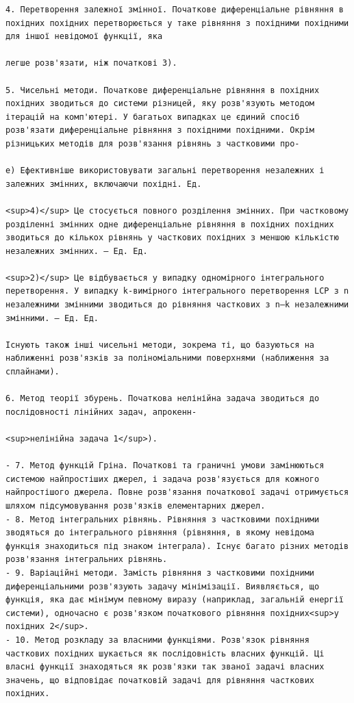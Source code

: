 \documentclass[
  ukrainian,
]{article}
\begin{document}
\begin{verbatim}
4. Перетворення залежної змінної. Початкове диференціальне рівняння в похідних похідних перетворюється у таке рівняння з похідними похідними для іншої невідомої функції, яка

легше розв'язати, ніж початкові 3).

5. Чисельні методи. Початкове диференціальне рівняння в похідних похідних зводиться до системи різницей, яку розв'язують методом ітерацій на комп'ютері. У багатьох випадках це єдиний спосіб розв'язати диференціальне рівняння з похідними похідними. Окрім різницьких методів для розв'язання рівнянь з частковими про-

e) Ефективніше використовувати загальні перетворення незалежних і залежних змінних, включаючи похідні. Ед.

<sup>4)</sup> Це стосується повного розділення змінних. При частковому розділенні змінних одне диференціальне рівняння в похідних похідних зводиться до кількох рівнянь у часткових похідних з меншою кількістю незалежних змінних. — Ед. Ед.

<sup>2)</sup> Це відбувається у випадку одномірного інтегрального перетворення. У випадку k-вимірного інтегрального перетворення LCP з n незалежними змінними зводиться до рівняння часткових з n—k незалежними змінними. — Ед. Ед.

Існують також інші чисельні методи, зокрема ті, що базуються на наближенні розв'язків за поліноміальними поверхнями (наближення за сплайнами).

6. Метод теорії збурень. Початкова нелінійна задача зводиться до послідовності лінійних задач, апрокенн-

<sup>нелінійна задача 1</sup>).

- 7. Метод функцій Гріна. Початкові та граничні умови замінюються системою найпростіших джерел, і задача розв'язується для кожного найпростішого джерела. Повне розв'язання початкової задачі отримується шляхом підсумовування розв'язків елементарних джерел.
- 8. Метод інтегральних рівнянь. Рівняння з частковими похідними зводяться до інтегрального рівняння (рівняння, в якому невідома функція знаходиться під знаком інтеграла). Існує багато різних методів розв'язання інтегральних рівнянь.
- 9. Варіаційні методи. Замість рівняння з частковими похідними диференціальними розв'язують задачу мінімізації. Виявляється, що функція, яка дає мінімум певному виразу (наприклад, загальній енергії системи), одночасно є розв'язком початкового рівняння похідних<sup>у похідних 2</sup>.
- 10. Метод розкладу за власними функціями. Розв'язок рівняння часткових похідних шукається як послідовність власних функцій. Ці власні функції знаходяться як розв'язки так званої задачі власних значень, що відповідає початковій задачі для рівняння часткових похідних.


\end{verbatim}
\end{document}
